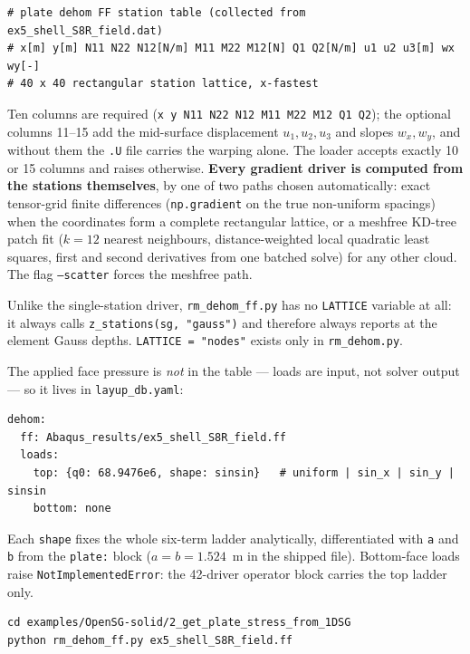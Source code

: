 \begin{lstlisting}[style=shellst]
# plate dehom FF station table (collected from ex5_shell_S8R_field.dat)
# x[m] y[m] N11 N22 N12[N/m] M11 M22 M12[N] Q1 Q2[N/m] u1 u2 u3[m] wx wy[-]
# 40 x 40 rectangular station lattice, x-fastest
\end{lstlisting}

Ten columns are required (\texttt{x y N11 N22 N12 M11 M22 M12 Q1 Q2}); the
optional columns 11--15 add the mid-surface displacement $u_1, u_2, u_3$ and
slopes $w_x, w_y$, and without them the \texttt{.U} file carries the warping
alone. The loader accepts exactly 10 or 15 columns and raises otherwise.
\textbf{Every gradient driver is computed from the stations themselves}, by one
of two paths chosen automatically: exact tensor-grid finite differences
(\texttt{np.gradient} on the true non-uniform spacings) when the coordinates
form a complete rectangular lattice, or a meshfree KD-tree patch fit
($k = 12$ nearest neighbours, distance-weighted local quadratic least squares,
first and second derivatives from one batched solve) for any other cloud. The
flag \texttt{--scatter} forces the meshfree path.

Unlike the single-station driver, \texttt{rm\_dehom\_ff.py} has no
\texttt{LATTICE} variable at all: it always calls
\texttt{z\_stations(sg, "gauss")} and therefore always reports at the element
Gauss depths. \texttt{LATTICE = "nodes"} exists only in \texttt{rm\_dehom.py}.

The applied face pressure is \emph{not} in the table --- loads are input, not
solver output --- so it lives in \texttt{layup\_db.yaml}:

\begin{lstlisting}[style=opensg,caption={The dehom: block of layup\_db.yaml.}]
dehom:
  ff: Abaqus_results/ex5_shell_S8R_field.ff
  loads:
    top: {q0: 68.9476e6, shape: sinsin}   # uniform | sin_x | sin_y | sinsin
    bottom: none
\end{lstlisting}

Each \texttt{shape} fixes the whole six-term ladder analytically, differentiated
with \texttt{a} and \texttt{b} from the \texttt{plate:} block ($a = b = 1.524$~m
in the shipped file). Bottom-face loads raise \texttt{NotImplementedError}: the
42-driver operator block carries the top ladder only.

\begin{lstlisting}[style=shellst]
cd examples/OpenSG-solid/2_get_plate_stress_from_1DSG
python rm_dehom_ff.py ex5_shell_S8R_field.ff
\end{lstlisting}

